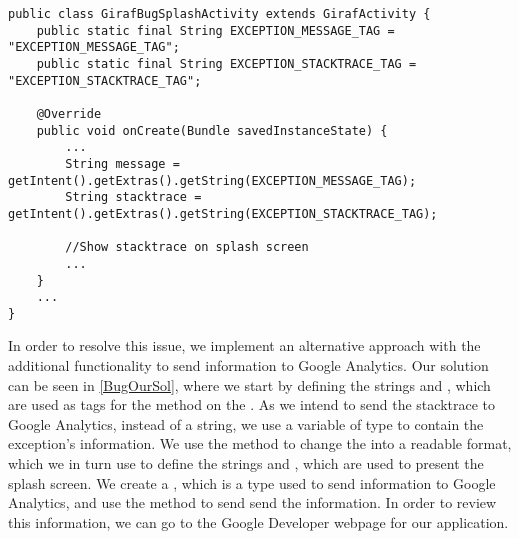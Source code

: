 \begin{minipage}[H]{\linewidth}
\begin{lstlisting}[caption = Code responsible for showing the GIRAF splash screen., label = GSplash]
public class GirafBugSplashActivity extends GirafActivity { 
	public static final String EXCEPTION_MESSAGE_TAG = "EXCEPTION_MESSAGE_TAG"; 
	public static final String EXCEPTION_STACKTRACE_TAG = "EXCEPTION_STACKTRACE_TAG";
	
	@Override
    public void onCreate(Bundle savedInstanceState) {
		...
		String message = getIntent().getExtras().getString(EXCEPTION_MESSAGE_TAG);
        String stacktrace = getIntent().getExtras().getString(EXCEPTION_STACKTRACE_TAG);
        
        //Show stacktrace on splash screen
        ...
    }	
	...
}
\end{lstlisting}
\end{minipage}

In order to resolve this issue, we implement an alternative approach with the
additional functionality to send information to Google Analytics. Our solution
can be seen in \autoref{BugOurSol}, where we start by defining the strings
 and , which are used as tags for
the  method on the . As we intend to send the
stacktrace to Google Analytics, instead of a string, we use a variable of type  to
contain the exception's information. We use the method  to change the
 into a readable format, which we in turn use to define the
strings  and , which are used to present the
splash screen. We create a , which is a type used to send
information to Google Analytics, and use the  method to send
send the information. In order to review this information, we can go to the
Google Developer webpage for our application.\nl 

